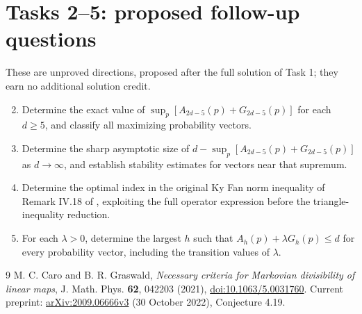 \documentclass[11pt]{article}
\begin{document}
\section*{Tasks 2--5: proposed follow-up questions}
These are unproved directions, proposed after the full solution
of Task 1; they earn no additional solution credit.
\begin{enumerate}
\setcounter{enumi}{1}
\item Determine the exact value of
$\sup_p[A_{2d-5}(p)+G_{2d-5}(p)]$ for each $d\ge5$,
and classify all maximizing probability vectors.
\item Determine the sharp asymptotic size of
$d-\sup_p[A_{2d-5}(p)+G_{2d-5}(p)]$ as $d\to\infty$,
and establish stability estimates for vectors near that supremum.
\item Determine the optimal index in the original Ky Fan norm
inequality of Remark IV.18 of \cite{CG}, exploiting the full
operator expression before the triangle-inequality reduction.
\item For each $\lambda>0$, determine the largest $h$ such that
$A_h(p)+\lambda G_h(p)\le d$ for every probability vector,
including the transition values of $\lambda$.
\end{enumerate}

\begin{thebibliography}{9}
 M. C. Caro and B. R. Graswald,
\emph{Necessary criteria for Markovian divisibility of linear maps},
J. Math. Phys. \textbf{62}, 042203 (2021),
\href{https://doi.org/10.1063/5.0031760}{doi:10.1063/5.0031760}.
Current preprint: \href{https://arxiv.org/abs/2009.06666v3}{arXiv:2009.06666v3}
(30 October 2022), Conjecture 4.19.
\end{thebibliography}
\end{document}
